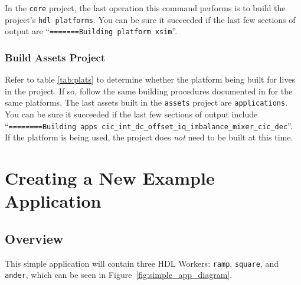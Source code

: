 In the \texttt{core} project, the last operation this command performs is to build the project's \texttt{hdl platforms}. You can be sure it succeeded if the last few sections of output are ``\texttt{=======Building platform xsim}''.\\
\begin{center}
\end{center}


\subsubsection{Build Assets Project}
Refer to table \ref{tab:plats} to determine whether the platform being built for lives in the  project. If so, follow the same building procedures documented in  for the same platforms. The last assets built in the \texttt{assets} project are \texttt{applications}. You can be sure it succeeded if the last few sections of output include ``\texttt{========Building apps cic\_int\_dc\_offset\_iq\_imbalance\_mixer\_cic\_dec}''.\\

If the  platform is being used, the  project does \textit{not} need to be built at this time.\\

\newpage
\section{Creating a New Example Application}
\label{sec:basic_example}
\subsection{Overview}
This simple application will contain three HDL Workers: \verb+ramp+, \verb+square+, and \verb+ander+, which can be seen in Figure~\ref{fig:simple_app_diagram}. \newline

